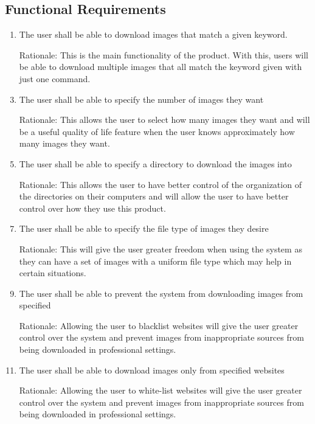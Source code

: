 \documentclass[12pt, titlepage]{article}
\begin{document}
\subsection{Functional Requirements}

\begin{enumerate}[label=FR \arabic*:, wide=0pt, leftmargin=*]
    \item The user shall be able to download images that match a given keyword.
    \item[Rationale:] This is the main functionality of the product. With this, users will be able to download multiple images that all match the keyword given with just one command.
    \\
    \item The user shall be able to specify the number of images they want
    \item[Rationale:] This allows the user to select how many images they want and will be a useful quality of life feature when the user knows approximately how many images they want.
    \\
    \item The user shall be able to specify a directory to download the images into
    \item[Rationale:] This allows the user to have better control of the organization of the directories on their computers and will allow the user to have better control over how they use this product.
    \\
    \item The user shall be able to specify the file type of images they desire
    \item[Rationale:] This will give the user greater freedom when using the system as they can have a set of images with a uniform file type which may help in certain situations.
    \\
    \item The user shall be able to prevent the system from downloading images from specified
    \item[Rationale:] Allowing the user to blacklist websites will give the user greater control over the system and prevent images from inappropriate sources from being downloaded in professional settings. 
    \\
    \item The user shall be able to download images only from specified websites
    \item[Rationale:] Allowing the user to white-list websites will give the user greater control over the system and prevent images from inappropriate sources from being downloaded in professional settings. 

\end{enumerate}
\end{document}
